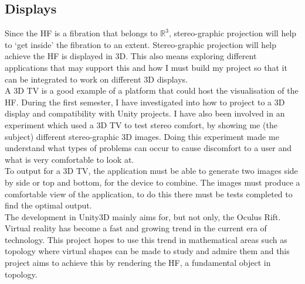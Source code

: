 \documentclass[12pt]{article} %
\begin{document}
\begin{flushleft}
\subsection{Displays} %
Since the HF is a fibration that belongs to $\mathbb{R}^{3}$, stereo-graphic projection will help to ‘get inside’ the fibration to an extent. Stereo-graphic projection will help achieve the HF is displayed in 3D. This also means exploring different applications that may support this and how I must build my project so that it can be integrated to work on different 3D displays.  \\

A 3D TV is a good example of a platform that could host the visualisation of the HF. During the first semester, I have investigated into how to project to a 3D display and compatibility with Unity projects. I have also been involved in an experiment which used a 3D TV to test stereo comfort, by showing me (the subject) different stereo-graphic 3D images. Doing this experiment made me understand what types of problems can occur to cause discomfort to a user and what is very comfortable to look at. \\

To output for a 3D TV, the application must be able to generate two images side by side or top and bottom, for the device to combine. The images must produce a comfortable view of the application, to do this there must be tests completed to find the optimal output. \\

The development in Unity3D mainly aims for, but not only, the Oculus Rift. Virtual reality has become a fast and growing trend in the current era of technology. This project hopes to use this trend in mathematical areas such as topology where virtual shapes can be made to study and admire them and this project aims to achieve this by rendering the HF, a fundamental object in topology.\\




\end{flushleft}
\end{document}
